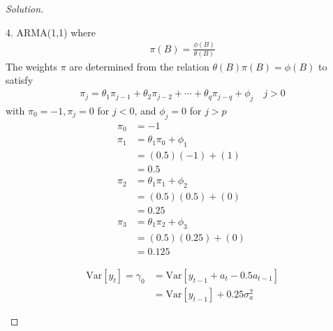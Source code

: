 \documentclass[UTF8,a4paper,14pt]{ctexart}
\newcommand{\Var}{\mathrm{Var}}
\newenvironment{solution}
  {\renewcommand\qedsymbol{$\blacksquare$}\begin{proof}[Solution]}
  {\end{proof}}
\theoremstyle{definition}
\theoremstyle{remark}
\begin{document}
\begin{solution}
\begin{mybox}{4. ARMA(1,1)}
    where
      \begin{equation}\
        \begin{aligned}
        \pi(B) = \frac{\phi(B)}{\theta(B)}
        \end{aligned}
      \end{equation}
      The weights \(\pi\) are determined from the relation \(\theta(B)\pi(B)= \phi(B)\) to satisfy
      \begin{equation}\
        \begin{aligned}
        \pi_j = \theta_1\pi_{j-1}+\theta_2\pi_{j-2}+\cdots+\theta_q\pi_{j-q}+\phi_j\quad j>0
        \end{aligned}
      \end{equation}
      with \(\pi_0 = -1, \pi_j = 0\) for \(j<0\), and \(\phi_j = 0\) for \(j>p\)
      \begin{equation}
        \begin{aligned}
        \pi_0 &= -1\\
        \pi_1 &= \theta_1\pi_{0}+\phi_1\\
        &=(0.5)(-1)+(1)\\
        &=0.5\\
        \pi_2 &= \theta_1\pi_{1}+\phi_2\\
        &=(0.5)(0.5)+(0)\\
        &=0.25\\
        \pi_3 &= \theta_1\pi_{2}+\phi_3\\
        &=(0.5)(0.25)+(0)\\
        & = 0.125
        \end{aligned}
      \end{equation}

    \begin{equation}\
      \begin{aligned}
        \Var[y_t] = \gamma_0 &=  \Var[y_{t-1}+a_t -0.5a_{t-1} ]\\
        &=\Var[y_{t-1}]+0.25\sigma_a^2
      \end{aligned}
    \end{equation}


\end{mybox}
\end{solution}
\end{document}
